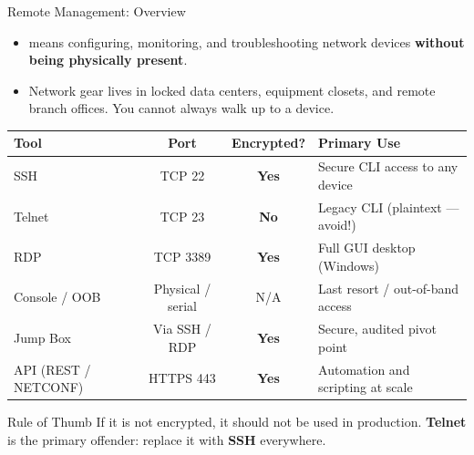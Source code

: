 \documentclass[aspectratio=169]{beamer}  %
\begin{document}
\begin{frame}[t]{Remote Management: Overview}
    \begin{itemize}
        \item {} means configuring, monitoring, and troubleshooting network devices \textbf{without being physically present}.
        \item Network gear lives in locked data centers, equipment closets, and remote branch offices. You cannot always walk up to a device.
    \end{itemize}
    \vspace{0.3em}
    \begin{center}
        \footnotesize
        \begin{tabular}{l c c l}
            \toprule
            \textbf{Tool}              & \textbf{Port}      & \textbf{Encrypted?}                   & \textbf{Primary Use} \\
            \midrule
            \rowcolor{networkgreen!15}
            SSH                        & TCP 22             & \textcolor{networkgreen}{\textbf{Yes}} & Secure CLI access to any device \\
            \rowcolor{alertred!10}
            Telnet                     & TCP 23             & \textcolor{alertred}{\textbf{No}}      & Legacy CLI (plaintext --- avoid!) \\
            \rowcolor{ipblue!15}
            RDP                        & TCP 3389           & \textcolor{networkgreen}{\textbf{Yes}} & Full GUI desktop (Windows) \\
            \rowcolor{aborange!15}
            Console / OOB              & Physical / serial  & N/A                                   & Last resort / out-of-band access \\
            \rowcolor{rctcblue!10}
            Jump Box                   & Via SSH / RDP      & \textcolor{networkgreen}{\textbf{Yes}} & Secure, audited pivot point \\
            \rowcolor{ippurple!10}
            API (REST / NETCONF)       & HTTPS 443          & \textcolor{networkgreen}{\textbf{Yes}} & Automation and scripting at scale \\
            \bottomrule
        \end{tabular}
    \end{center}
    \vspace{0.1em}
    \begin{exampleblock}{Rule of Thumb}
        \footnotesize If it is not encrypted, it should not be used in production. \textbf{Telnet} is the primary offender: replace it with \textbf{SSH} everywhere.
    \end{exampleblock}
\end{frame}
\end{document}
